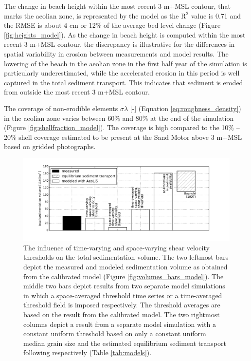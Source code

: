 The change in beach height within the most recent 3 m+MSL contour,
that marks the aeolian zone, is represented by the model as the
$\mathrm{R^2}$ value is 0.71 and the RMSE is about 4 cm or 12\% of the
average bed level change (Figure \ref{fig:heights_model}). As the
change in beach height is computed within the most recent 3 m+MSL
contour, the discrepancy is illustrative for the differences in
spatial variability in erosion between measurements and model
results. The lowering of the beach in the aeolian zone in the first
half year of the simulation is particularly underestimated, while the
accelerated erosion in this period is well captured in the total
sediment transport. This indicates that sediment is eroded from
outside the most recent 3 m+MSL contour.

The coverage of non-erodible elements $\sigma \lambda$ [-] (Equation
\ref{eq:roughness_density}) in the aeolian zone varies between 60\%
and 80\% at the end of the simulation (Figure
\ref{fig:shellfraction_model}). The coverage is high compared to the
10\% -- 20\% shell coverage estimated to be present at the Sand Motor
above 3 m+MSL based on gridded photographs.

\begin{figure}
  \centering
  \includegraphics[width=\columnwidth]{../Figures/space_vs_time}
  \caption{The influence of time-varying and space-varying shear
    velocity thresholds on the total sedimentation volume. The two
    leftmost bars depict the measured and modeled sedimentation volume
    as obtained from the calibrated model (Figure
    \ref{fig:volumes_bars_model}). The middle two bars depict results
    from two separate model simulations in which a space-averaged
    threshold time series or a time-averaged threshold field is
    imposed respectively. The threshold averages are based on the
    result from the calibrated model. The two rightmost columns depict
    a result from a separate model simulation with a constant uniform
    threshold based on only a constant uniform median grain size and
    the estimated equilibrium sediment transport following
    \citet{Bagnold1937a} respectively (Table \ref{tab:models}).}
  \label{fig:space_vs_time}
\end{figure}

